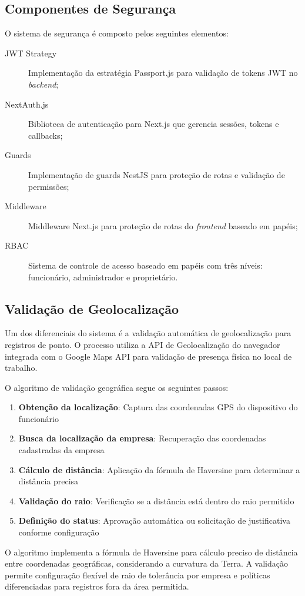\subsection{Componentes de Segurança}

O sistema de segurança é composto pelos seguintes elementos:

\begin{description}
    \item[JWT Strategy] Implementação da estratégia Passport.js para validação de tokens JWT no \textit{backend};
    \item[NextAuth.js] Biblioteca de autenticação para Next.js que gerencia sessões, tokens e callbacks;
    \item[Guards] Implementação de guards NestJS para proteção de rotas e validação de permissões;
    \item[Middleware] Middleware Next.js para proteção de rotas do \textit{frontend} baseado em papéis;
    \item[RBAC] Sistema de controle de acesso baseado em papéis com três níveis: funcionário, administrador e proprietário.
\end{description}

\subsection{Validação de Geolocalização}

Um dos diferenciais do sistema é a validação automática de geolocalização para registros de ponto. O processo utiliza a API de Geolocalização do navegador integrada com o Google Maps API para validação de presença física no local de trabalho.

O algoritmo de validação geográfica segue os seguintes passos:

\begin{enumerate}
    \item \textbf{Obtenção da localização}: Captura das coordenadas GPS do dispositivo do funcionário
    \item \textbf{Busca da localização da empresa}: Recuperação das coordenadas cadastradas da empresa
    \item \textbf{Cálculo de distância}: Aplicação da fórmula de Haversine para determinar a distância precisa
    \item \textbf{Validação do raio}: Verificação se a distância está dentro do raio permitido
    \item \textbf{Definição do status}: Aprovação automática ou solicitação de justificativa conforme configuração
\end{enumerate}

O algoritmo implementa a fórmula de Haversine para cálculo preciso de distância entre coordenadas geográficas, considerando a curvatura da Terra. A validação permite configuração flexível de raio de tolerância por empresa e políticas diferenciadas para registros fora da área permitida.